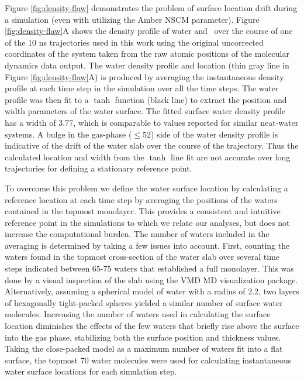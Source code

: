 \documentclass{article}
\begin{document}
Figure \ref{fig:density-flaw} demonstrates the problem of surface location drift during a simulation (even with utilizing the Amber NSCM parameter). Figure \ref{fig:density-flaw}A shows the density profile of water and \suldiox~over the course of one of the 10 ns trajectories used in this work using the original uncorrected coordinates of the system taken from the raw atomic positions of the molecular dynamics data output. The water density profile and location (thin gray line in Figure \ref{fig:density-flaw}A) is produced by averaging the instantaneous density profile at each time step in the simulation over all the time steps. The water profile was then fit to a $\tanh$ function (black line) to extract the position and width parameters of the water surface. The fitted surface water density profile has a width of 3.77\angs, which is comparable to values reported for similar neat-water systems.\cite{Dang1997,Hore2008} A bulge in the gas-phase ($\leq 52$\angs) side of the water density profile is indicative of the drift of the water slab over the course of the trajectory. Thus the calculated location and width from the $\tanh$ line fit are not accurate over long trajectories for defining a stationary reference point. 

	To overcome this problem we define the water surface location by calculating a reference location at each time step by averaging the positions of the waters contained in the topmost monolayer. This provides a consistent and intuitive reference point in the simulations to which we relate our analyses, but does not increase the computational burden. The number of waters included in the averaging is determined by taking a few issues into account. First, counting the waters found in the topmost cross-section of the water slab over several time steps indicated between 65-75 waters that established a full monolayer. This was done by a visual inspection of the slab using the VMD MD visualization package.\cite{Humphrey1996} Alternatively, assuming a spherical model of water with a radius of 2.2\angs, two layers of hexagonally tight-packed spheres yielded a similar number of surface water molecules. Increasing the number of waters used in calculating the surface location diminishes the effects of the few waters that briefly rise above the surface into the gas phase, stabilizing both the surface position and thickness values. Taking the close-packed model as a maximum number of waters fit into a flat surface, the topmost 70 water molecules were used for calculating instantaneous water surface locations for each simulation step. 
  
\end{document}
